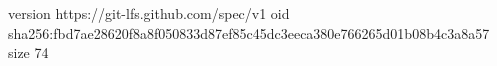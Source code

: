 version https://git-lfs.github.com/spec/v1
oid sha256:fbd7ae28620f8a8f050833d87ef85c45dc3eeca380e766265d01b08b4c3a8a57
size 74
